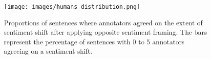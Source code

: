 \begin{figure}
    \centering
    \texttt{[image: images/humans\_distribution.png]}
    \caption{Proportions of sentences where annotators agreed on the extent of sentiment shift after applying opposite sentiment framing. The bars represent the percentage of sentences with 0 to 5 annotators agreeing on a sentiment shift.}
    \label{fig:humans-flip}
\end{figure}